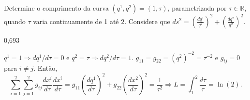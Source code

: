 \begin{question}
    Determine o comprimento da curva $(q^1, q^2) = (1, \tau)$, parametrizada por $\tau \in \mathbb{R}$, quando $\tau$ varia continuamente de 1 até 2.
    Considere que $ds^2 = \left(\frac{dq^1}{q^2}\right)^2 + \left(\frac{dq^2}{q^2}\right)^2$.

    \begin{answer}
      0,693
    \end{answer}

    \begin{solution}
      $q^1 = 1 \Rightarrow dq^1/d\tau = 0$ e $q^2 = \tau \Rightarrow dq^2/d\tau = 1$.
      $g_{11} = g_{22} = (q^2)^{-2} = \tau^{-2}$ e $g_{ij} = 0$ para $i \ne j$.
      Então,
      \begin{equation*}
        \sum_{i=1}^2\sum_{j=1}^2 g_{ij} \frac{dx^i}{d\tau} \frac{dx^i}{d\tau} =
          g_{11} \left(\frac{dq^1}{d\tau}\right)^2 + g_{22} \left(\frac{dx^2}{d\tau}\right)^2 =
          \frac{1}{\tau^2}
        \Rightarrow
        L = \int_1^2 \frac{d\tau}{\tau} = \ln (2).
      \end{equation*}
    \end{solution}
\end{question}